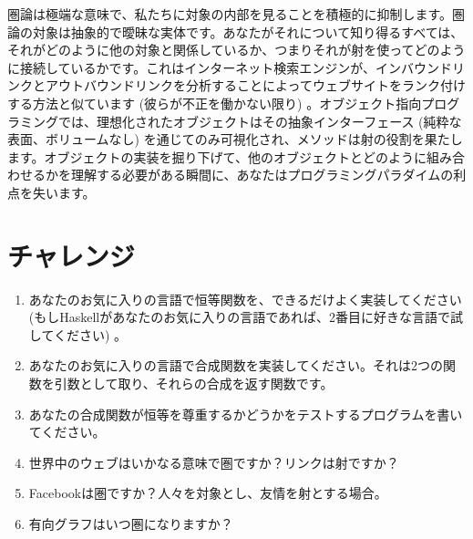 圏論は極端な意味で、私たちに対象の内部を見ることを積極的に抑制します。圏論の対象は抽象的で曖昧な実体です。あなたがそれについて知り得るすべては、それがどのように他の対象と関係しているか、つまりそれが射を使ってどのように接続しているかです。これはインターネット検索エンジンが、インバウンドリンクとアウトバウンドリンクを分析することによってウェブサイトをランク付けする方法と似ています (彼らが不正を働かない限り) 。オブジェクト指向プログラミングでは、理想化されたオブジェクトはその抽象インターフェース (純粋な表面、ボリュームなし) を通じてのみ可視化され、メソッドは射の役割を果たします。オブジェクトの実装を掘り下げて、他のオブジェクトとどのように組み合わせるかを理解する必要がある瞬間に、あなたはプログラミングパラダイムの利点を失います。

\section{チャレンジ}

\begin{enumerate}
  \tightlist
  \item
        あなたのお気に入りの言語で恒等関数を、できるだけよく実装してください (もしHaskellがあなたのお気に入りの言語であれば、2番目に好きな言語で試してください) 。
  \item
        あなたのお気に入りの言語で合成関数を実装してください。それは2つの関数を引数として取り、それらの合成を返す関数です。
  \item
        あなたの合成関数が恒等を尊重するかどうかをテストするプログラムを書いてください。
  \item
        世界中のウェブはいかなる意味で圏ですか？リンクは射ですか？
  \item
        Facebookは圏ですか？人々を対象とし、友情を射とする場合。
  \item
        有向グラフはいつ圏になりますか？
\end{enumerate}

